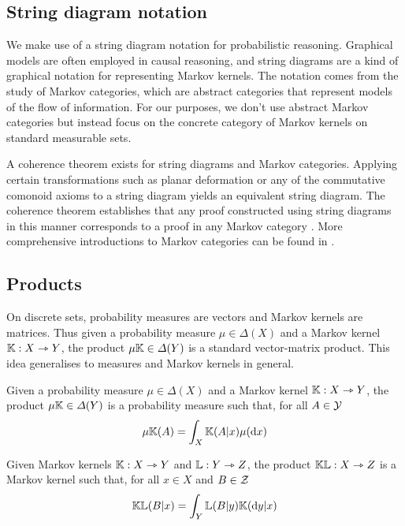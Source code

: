 

\subsection{String diagram notation}\label{sec:string_diagrams}

We make use of a string diagram notation for probabilistic reasoning. Graphical models are often employed in causal reasoning, and string diagrams are a kind of graphical notation for representing Markov kernels. The notation comes from the study of Markov categories, which are abstract categories that represent models of the flow of information. For our purposes, we don't use abstract Markov categories but instead focus on the concrete category of Markov kernels on standard measurable sets.

A coherence theorem exists for string diagrams and Markov categories. Applying certain transformations such as planar deformation or any of the commutative comonoid axioms to a string diagram yields an equivalent string diagram. The coherence theorem establishes that any proof constructed using string diagrams in this manner corresponds to a proof in any Markov category \citep{selinger_survey_2011}. More comprehensive introductions to Markov categories can be found in \citet{fritz_synthetic_2020,cho_disintegration_2019}.

\subsection{Products}

On discrete sets, probability measures are vectors and Markov kernels are matrices. Thus given a probability measure $\mu\in \Delta(X)$ and a Markov kernel $\mathbb{K}:X\rightarrowtriangle Y$, the product $\mu\mathbb{K}\in \Delta(Y)$ is a standard vector-matrix product. This idea generalises to measures and Markov kernels in general.

\begin{definition}
Given a probability measure $\mu\in \Delta(X)$ and a Markov kernel $\mathbb{K}:X\rightarrowtriangle Y$, the product $\mu\mathbb{K}\in \Delta(Y)$ is a probability measure such that, for all $A\in \mathcal{Y}$
\begin{align}
     \mu\mathbb{K}(A)=\int_{X} \mathbb{K}(A|x)\mu(\mathrm{d}x)
\end{align}
\end{definition}

\begin{definition}
Given Markov kernels $\mathbb{K}:X\rightarrowtriangle Y$ and $\mathbb{L}:Y\rightarrowtriangle Z$, the product $\mathbb{K}\mathbb{L}:X\rightarrowtriangle Z$ is a Markov kernel such that, for all $x\in X$ and $B\in \mathcal{Z}$
\begin{align}
     \mathbb{K}\mathbb{L}(B|x)=\int_{Y} \mathbb{L}(B|y)\mathbb{K}(\mathrm{d}y|x)
\end{align}
\end{definition}

